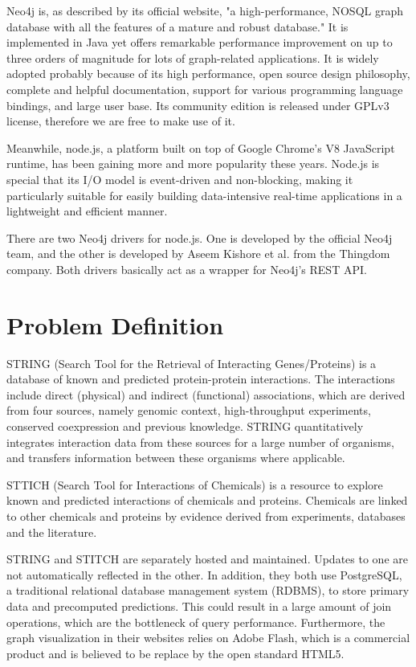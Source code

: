 \documentclass[10pt, conference, compsocconf]{../IEEEtran}
\begin{document}
Neo4j is, as described by its official website, "a high-performance, NOSQL graph database with all the features of a mature and robust database." It is implemented in Java yet offers remarkable performance improvement on up to three orders of magnitude for lots of graph-related applications. It is widely adopted probably because of its high performance, open source design philosophy, complete and helpful documentation, support for various programming language bindings, and large user base. Its community edition is released under GPLv3 license, therefore we are free to make use of it.

Meanwhile, node.js, a platform built on top of Google Chrome's V8 JavaScript runtime, has been gaining more and more popularity these years. Node.js is special that its I/O model is event-driven and non-blocking, making it particularly suitable for easily building data-intensive real-time applications in a lightweight and efficient manner. 

There are two Neo4j drivers for node.js. One is developed by the official Neo4j team, and the other is developed by Aseem Kishore et al. from the Thingdom company. Both drivers basically act as a wrapper for Neo4j's REST API.

\section{Problem Definition}

STRING (Search Tool for the Retrieval of Interacting Genes/Proteins) \citep{1070,1071,1072,1073,1074,1075} is a database of known and predicted protein-protein interactions. The interactions include direct (physical) and indirect (functional) associations, which are derived from four sources, namely genomic context, high-throughput experiments, conserved coexpression and previous knowledge. STRING quantitatively integrates interaction data from these sources for a large number of organisms, and transfers information between these organisms where applicable.

STTICH (Search Tool for Interactions of Chemicals) \citep{1068,1069} is a resource to explore known and predicted interactions of chemicals and proteins. Chemicals are linked to other chemicals and proteins by evidence derived from experiments, databases and the literature.

STRING and STITCH are separately hosted and maintained. Updates to one are not automatically reflected in the other. In addition, they both use PostgreSQL, a traditional relational database management system (RDBMS), to store primary data and precomputed predictions. This could result in a large amount of join operations, which are the bottleneck of query performance. Furthermore, the graph visualization in their websites relies on Adobe Flash, which is a commercial product and is believed to be replace by the open standard HTML5.
\end{document}
